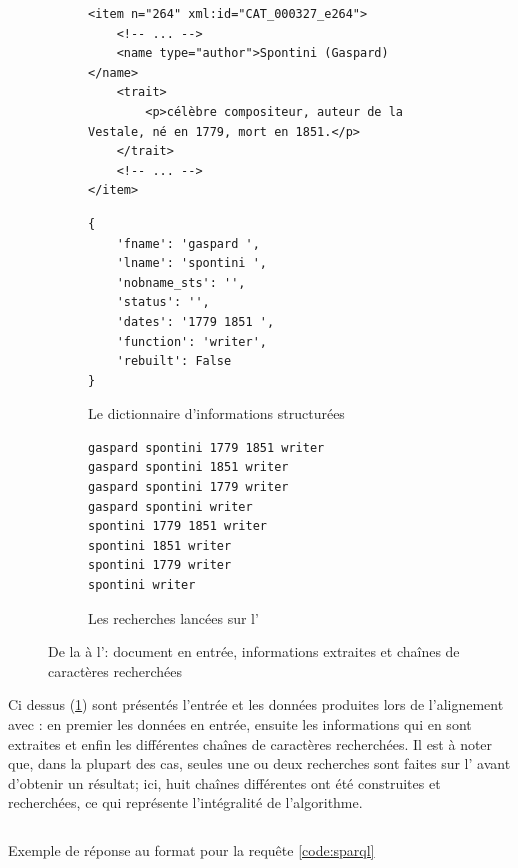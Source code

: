 \clearpage
\begin{figure}[!htb]
	\begin{subfigure}{\textwidth}
		\begin{verbatim}
<item n="264" xml:id="CAT_000327_e264">
	<!-- ... -->
	<name type="author">Spontini (Gaspard)</name>
	<trait>
		<p>célèbre compositeur, auteur de la Vestale, né en 1779, mort en 1851.</p>
	</trait>
	<!-- ... -->
</item>
		\end{verbatim}
	\end{subfigure}
	\begin{subfigure}{\textwidth}
		\begin{verbatim}
{
	'fname': 'gaspard ', 
	'lname': 'spontini ', 
	'nobname_sts': '', 
	'status': '', 
	'dates': '1779 1851 ', 
	'function': 'writer', 
	'rebuilt': False
}
		\end{verbatim}
		\caption{Le dictionnaire d'informations structurées}
	\end{subfigure}
	\begin{subfigure}{\textwidth}
		\begin{lstlisting}
gaspard spontini 1779 1851 writer
gaspard spontini 1851 writer
gaspard spontini 1779 writer
gaspard spontini writer
spontini 1779 1851 writer
spontini 1851 writer
spontini 1779 writer
spontini writer
		\end{lstlisting}
		\caption{Les recherches lancées sur l'\api{} \wkd{}}
	\end{subfigure}
	\caption{De la \tei{} à l'\api{}: document en entrée, informations extraites et chaînes de caractères recherchées}
	\label{code:apipipeline}
\end{figure}
Ci dessus (\ref{code:apipipeline}) sont présentés l'entrée et les données produites lors de l'alignement avec \wkd{}: en premier les données en entrée, ensuite les informations qui en sont extraites et enfin les différentes chaînes de caractères recherchées. Il est à noter que, dans la plupart des cas, seules une ou deux recherches sont faites sur l'\api{} avant d'obtenir un résultat; ici, huit chaînes différentes ont été construites et recherchées, ce qui représente l'intégralité de l'algorithme.
\clearpage

\begin{multipageminted}
	\inputminted[breakanywhere]{python}{./annexes/sparql_result.json}
	\caption{Exemple de réponse \sparql{} au format \json{} pour la requête \ref{code:sparql}}
	\label{appendix:sparqlout_json}
\end{multipageminted}
\clearpage

